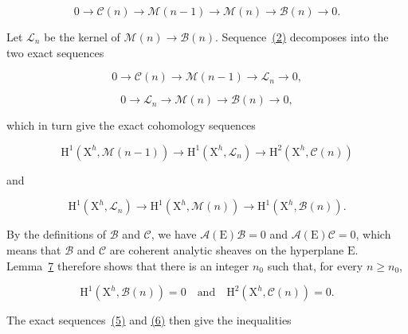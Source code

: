 \begin{equation*}\tag{2}
0\longrightarrow\mathcal{C}(n)\longrightarrow\mathcal{M}(n-1)
\longrightarrow\mathcal{M}(n)\longrightarrow\mathcal{B}(n)\longrightarrow0.
\end{equation*}

Let $\mathcal{L}_n$ be the kernel of $\mathcal{M}(n)\to\mathcal{B}(n)$. Sequence~\hyperref[gaga:eq:2]{(2)} decomposes into the two exact sequences

\begin{equation*}\tag{3}
0\longrightarrow\mathcal{C}(n)\longrightarrow\mathcal{M}(n-1)
\longrightarrow\mathcal{L}_n\longrightarrow0,
\end{equation*}

\begin{equation*}\tag{4}
0\longrightarrow\mathcal{L}_n\longrightarrow\mathcal{M}(n)
\longrightarrow\mathcal{B}(n)\longrightarrow0,
\end{equation*}

which in turn give the exact cohomology sequences

\begin{equation*}\tag{5}
\mathrm{H}^1(\mathrm{X}^h,\mathcal{M}(n-1))
\longrightarrow\mathrm{H}^1(\mathrm{X}^h,\mathcal{L}_n)
\longrightarrow\mathrm{H}^2(\mathrm{X}^h,\mathcal{C}(n))
\end{equation*}

and

\begin{equation*}\tag{6}
\mathrm{H}^1(\mathrm{X}^h,\mathcal{L}_n)
\longrightarrow\mathrm{H}^1(\mathrm{X}^h,\mathcal{M}(n))
\longrightarrow\mathrm{H}^1(\mathrm{X}^h,\mathcal{B}(n)).
\end{equation*}

By the definitions of $\mathcal{B}$ and $\mathcal{C}$, we have $\mathcal{A}(\mathrm{E})\mathcal{B}=0$ and $\mathcal{A}(\mathrm{E})\mathcal{C}=0$, which means that $\mathcal{B}$ and $\mathcal{C}$ are coherent analytic sheaves on the hyperplane $\mathrm{E}$. Lemma~\hyperref[gaga:lemma:7]{7} therefore shows that there is an integer $n_0$ such that, for every $n\geqslant n_0$,

\begin{equation*}
\mathrm{H}^1(\mathrm{X}^h,\mathcal{B}(n))=0
\quad\text{and}\quad
\mathrm{H}^2(\mathrm{X}^h,\mathcal{C}(n))=0.
\end{equation*}

The exact sequences~\hyperref[gaga:eq:5]{(5)} and \hyperref[gaga:eq:6]{(6)} then give the inequalities

